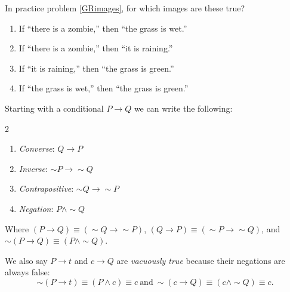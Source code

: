 \clearpage

\begin{practiceprob}
    In practice problem \ref{GRimages}, for which images are these true?
    \begin{enumerate}
    \setlength{\itemsep}{\baselineskip}
        \item If ``there is a zombie,'' then ``the grass is wet.''
        \item If ``there is a zombie,'' then ``it is raining.'' 
        \item If ``it is raining,'' then ``the grass is green.'' 
        \item If ``the grass is wet,'' then ``the grass is green.'' \vspace{\baselineskip}
    \end{enumerate}
\end{practiceprob}



\begin{exposition}
    Starting with a conditional \(P \rightarrow Q\) we can write the following:
    \begin{multicols}{2}
        \begin{enumerate}
            \item \emph{Converse}: \(Q\rightarrow P\)
            \item \emph{Inverse}: \(\sim P\rightarrow \sim Q\)
            \item \emph{Contrapositive}: \(\sim Q\rightarrow \sim P\)
            \item \emph{Negation}: \(P\wedge \sim Q\)
        \end{enumerate}
    \end{multicols}
    Where \((P\rightarrow Q) \equiv (\sim Q \rightarrow \sim P)\), 
    \((Q\rightarrow P) \equiv (\sim P \rightarrow \sim Q)\), 
    and \(\sim (P\rightarrow Q) \equiv (P \wedge \sim Q)\).
    
    We also say \(P\rightarrow t\) and \(c\rightarrow Q\) are \emph{vacuously true} because their negations are always false:
        \[\sim (P\rightarrow t) \equiv (P \wedge c) \equiv c\ \text{and}\ \sim (c\rightarrow Q) \equiv (c \wedge \sim Q) \equiv c.\]
\end{exposition}

